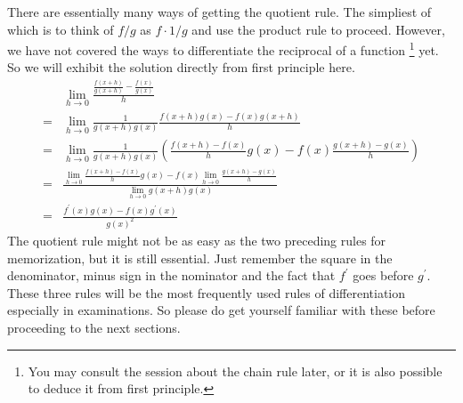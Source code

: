There are essentially many ways of getting the quotient rule.
The simpliest of which is to think of $f/g$ as $f\cdot 1/g$ and use the product rule to proceed.
However, we have not covered the ways to differentiate the reciprocal of a function
\footnote{You may consult the session about the chain rule later, or it is also possible to deduce it from first principle.}
yet.
So we will exhibit the solution directly from first principle here.
\begin{align*}
    &\lim_{h\to0}\frac{\frac{f(x+h)}{g(x+h)}-\frac{f(x)}{g(x)}}{h}\\
    =&\lim_{h\to0}\frac{1}{g(x+h)g(x)}\frac{f(x+h)g(x)-f(x)g(x+h)}{h}\\
    =&\lim_{h\to0}\frac{1}{g(x+h)g(x)}
    \left(\frac{f(x+h)-f(x)}{h}g(x)-f(x)\frac{g(x+h)-g(x)}{h}\right)\\
    =&\frac{\lim_{h\to0}\frac{f(x+h)-f(x)}{h}g(x)-f(x)\lim_{h\to0}\frac{g(x+h)-g(x)}{h}}{\lim_{h\to0}g(x+h)g(x)}\\
    =&\frac{f^\prime(x)g(x)-f(x)g^\prime(x)}{g(x)^2}
\end{align*}
The quotient rule might not be as easy as the two preceding rules for memorization, but it is still essential.
Just remember the square in the denominator, minus sign in the nominator and the fact that $f^\prime$ goes before $g^\prime$.\\
These three rules will be the most frequently used rules of differentiation especially in examinations. So please do get yourself familiar with these before proceeding to the next sections.